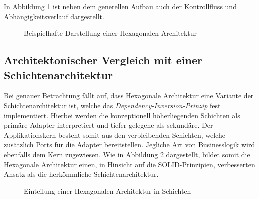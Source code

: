 \documentclass[conference]{IEEEtran}
\begin{document}
In Abbildung \ref{fig:HexagonaleArchitektur} ist neben dem generellen Aufbau auch der Kontrollfluss und Abhängigkeitsverlauf dargestellt. 

\begin{figure}[htbp]
	\small
	
	\caption{Beispielhafte Darstellung einer Hexagonalen Architektur}
	\label{fig:HexagonaleArchitektur}
\end{figure}



\subsection{Architektonischer Vergleich mit einer Schichtenarchitektur}

Bei genauer Betrachtung fällt auf, dass Hexagonale Architektur eine Variante der Schichtenarchitektur ist, welche das \emph{Dependency-Inversion-Prinzip} fest implementiert. Hierbei werden die konzeptionell höherliegenden Schichten als primäre Adapter interpretiert und tiefer gelegene als sekundäre. Der Applikationskern besteht somit aus den verbleibenden Schichten, welche zusätzlich Ports für die Adapter bereitstellen. Jegliche Art von Businesslogik wird ebenfalls dem Kern zugewiesen. Wie in Abbildung \ref{fig:HexagonaleInSchichtenarchitektur} dargestellt, bildet somit die Hexagonale Architektur einen, in Hinsicht auf die SOLID-Prinzipien, verbesserten Ansatz als die herkömmliche Schichtenarchitektur.

\begin{figure}[htbp]
	
	\caption{Einteilung einer Hexagonalen Architektur in Schichten}
	\label{fig:HexagonaleInSchichtenarchitektur}
\end{figure}
\end{document}
